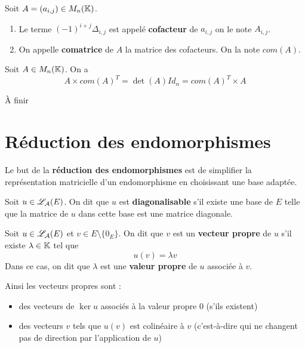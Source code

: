 \documentclass[a4paper, 12pt]{article}
\begin{document}
\begin{definition}
    Soit $A = (a_{i,j}) \in M_n(\mathbb{K})$.
    \begin{enumerate}
        \item Le terme $(-1)^{i+j} \Delta_{i,j}$ est appelé \textbf{cofacteur} de $a_{i,j}$ on le note $A_{i,j}$.
        \item On appelle \textbf{comatrice} de $A$ la matrice des cofacteurs. On la note $com(A)$.
    \end{enumerate}
\end{definition}

\begin{theoreme}{}{}
    Soit $A \in M_n(\mathbb{K})$. On a
    $$
    A \times com(A)^T = \det(A) Id_n = com(A)^T \times A
    $$
\end{theoreme}

\begin{hotwarn}
    À finir
\end{hotwarn}

\newpage
\section{Réduction des endomorphismes}

Le but de la \textbf{réduction des endomorphismes} est de simplifier la représentation matricielle d'un endomorphisme en choisissant une base adaptée.\n
\vspace{1cm}

\begin{definition}
    Soit $u \in \mathscr{L}_\mathcal{A}(E)$. On dit que $u$ est \textbf{diagonalisable} s'il existe une base de $E$ telle que la matrice de $u$ dans cette base est une matrice diagonale.
\end{definition}

\begin{definition}
    Soit $u \in \mathscr{L}_\mathcal{A}(E)$ et $v \in E\setminus\{0_E\}$. On dit que $v$ est un \textbf{vecteur propre} de $u$ s'il existe $\lambda \in \mathbb{K}$ tel que
    $$
    u(v) = \lambda v
    $$
    Dans ce cas, on dit que $\lambda$ est une \textbf{valeur propre} de $u$ associée à $v$.
\end{definition}

\begin{remarque}
    Ainsi les vecteurs propres sont :
    \begin{itemize}
        \item des vecteurs de $\ker u$ associés à la valeur propre $0$ (s'ils existent)
        \item des vecteurs $v$ tels que $u(v)$ est colinéaire à $v$ (c'est-à-dire qui ne changent pas de direction par l'application de $u$)
    \end{itemize}
\end{remarque}
\end{document}
